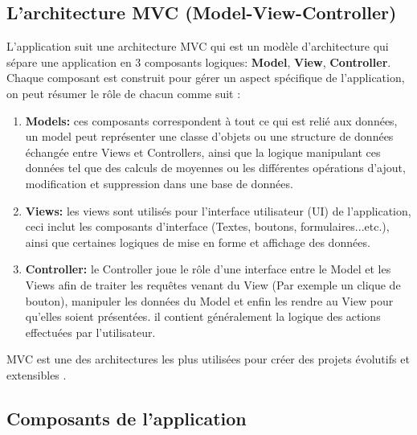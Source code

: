 \subsection{L'architecture MVC (Model-View-Controller)}
L'application suit une architecture MVC qui est un modèle d'architecture qui sépare une application en 3 composants logiques: \textbf{Model}, \textbf{View}, \textbf{Controller}.
Chaque composant est construit pour gérer un aspect spécifique de l'application, on peut résumer le rôle de chacun comme suit :
\begin{enumerate}
	\item \textbf{Models: } ces composants correspondent à tout ce qui est relié aux données, un model peut représenter une classe d'objets ou une structure de données échangée entre Views et Controllers, ainsi que la logique manipulant ces données tel que des calculs de moyennes ou les différentes opérations d'ajout, modification et suppression dans une base de données.
	\item \textbf{Views:} les views sont utilisés pour l'interface utilisateur (UI) de l'application, ceci inclut les composants d'interface (Textes, boutons, formulaires...etc.), ainsi que certaines logiques de mise en forme et affichage des données.
	\item \textbf{Controller: } le Controller joue le rôle d'une interface entre le Model et les Views afin de traiter les requêtes venant du View (Par exemple un clique de bouton), manipuler les données du Model et enfin les rendre au View pour qu'elles soient présentées. il contient généralement la logique des actions effectuées par l'utilisateur.
\end{enumerate}
	
MVC est une des architectures les plus utilisées pour créer des projets évolutifs et extensibles \cite{refMVC}.

\subsection{Composants de l'application}

